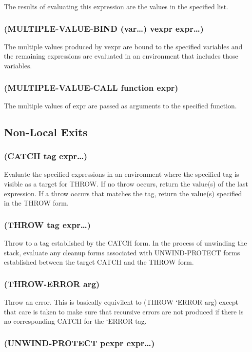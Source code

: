 \documentclass[11pt]{article}
\begin{document}
The results of evaluating this expression are the values in the
specified list.
\subsubsection{(MULTIPLE-VALUE-BIND (var\ldots{}) vexpr expr\ldots{})}
\label{sec-4-4-3}

The multiple values produced by vexpr are bound to the specified
variables and the remaining expressions are evaluated in an
environment that includes those variables.
\subsubsection{(MULTIPLE-VALUE-CALL function expr)}
\label{sec-4-4-4}

The multiple values of expr are passed as arguments to the specified
function.
\subsection{Non-Local Exits}
\label{sec-4-5}

\subsubsection{(CATCH tag expr\ldots{})}
\label{sec-4-5-1}

Evaluate the specified expressions in an environment where the
specified tag is visible as a target for THROW.  If no throw occurs,
return the value(s) of the last expression.  If a throw occurs that
matches the tag, return the value(s) specified in the THROW form.
\subsubsection{(THROW tag expr\ldots{})}
\label{sec-4-5-2}

Throw to a tag established by the CATCH form.  In the process of
unwinding the stack, evaluate any cleanup forms associated with
UNWIND-PROTECT forms established between the target CATCH and the
THROW form.
\subsubsection{(THROW-ERROR arg)}
\label{sec-4-5-3}

Throw an error.  This is basically equivilent to (THROW ‘ERROR arg)
except that care is taken to make sure that recursive errors are not
produced if there is no corresponding CATCH for the ‘ERROR tag.
\subsubsection{(UNWIND-PROTECT pexpr expr\ldots{})}
\label{sec-4-5-4}
\end{document}
